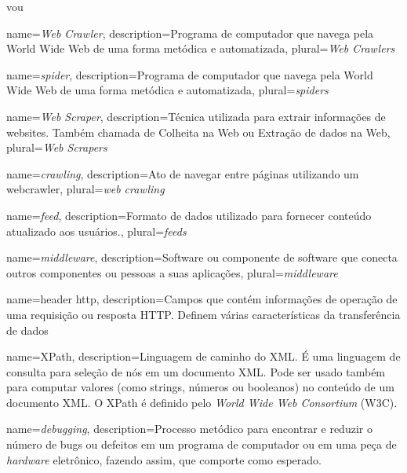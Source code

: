 vou %


				{name={\emph{Web Crawler}},
				 description={Programa de computador que navega pela World Wide Web de uma forma metódica e automatizada},
				 plural={\emph{Web Crawlers}}
				}

				{name={\emph{spider}},
				 description={Programa de computador que navega pela World Wide Web de uma forma metódica e automatizada},
				 plural={\emph{spiders}}
				}
				 
				{name={\emph{Web Scraper}},
				 description={Técnica utilizada para extrair informações de websites. Também chamada de Colheita na Web ou Extração de dados na Web},
				 plural={\emph{Web Scrapers}}
				 }
				 
				{name={\emph{crawling}},
				 description={Ato de navegar entre páginas utilizando um \gls{webcrawler}},
				 plural={\emph{web crawling}}
				}

				{name={\emph{feed}},
				 description={Formato de dados utilizado para fornecer conteúdo atualizado aos usuários.},
				 plural={\emph{feeds}}
				}

				{name={\emph{middleware}},
				 description={Software ou componente de software que conecta outros componentes ou pessoas a suas aplicações},
				 plural={\emph{middleware}}
				}
				
				{name={header http},
				 description={Campos que contém informações de operação de uma requisição ou resposta HTTP. Definem várias características da transferência de dados}
				}

				{name={XPath},
				 description={Linguagem de caminho do XML. É uma linguagem de consulta para seleção de nós em um documento XML. Pode ser usado também para computar valores (como strings, números ou booleanos) no conteúdo de um documento XML. O XPath é definido pelo \emph{World Wide Web Consortium} (W3C).}
				}

				{name={\emph{debugging}},
				 description={Processo metódico para encontrar e reduzir o número de bugs ou defeitos em um programa de computador ou em uma peça de \emph{hardware} eletrônico, fazendo assim, que comporte como esperado.}
				}

